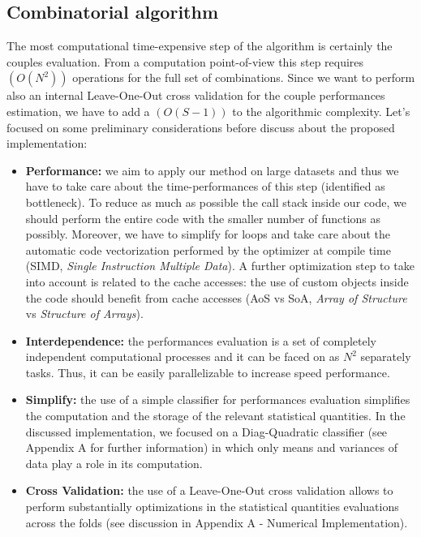 \documentclass{standalone}
\begin{document}
\subsection[Pairs evaluation]{Combinatorial algorithm}\label{implementation:couples}

The most computational time-expensive step of the algorithm is certainly the couples evaluation.
From a computation point-of-view this step requires $(O(N^2))$ operations for the full set of combinations.
Since we want to perform also an internal Leave-One-Out cross validation for the couple performances estimation, we have to add a $(O(S-1))$ to the algorithmic complexity.
Let's focused on some preliminary considerations before discuss about the proposed implementation:

\begin{itemize}

\item \textbf{Performance:} we aim to apply our method on large datasets and thus we have to take care about the time-performances of this step (identified as bottleneck).
To reduce as much as possible the call stack inside our code, we should perform the entire code with the smaller number of functions as possibly.
Moreover, we have to simplify \textsf{for} loops and take care about the automatic code vectorization performed by the optimizer at compile time (SIMD, \emph{Single Instruction Multiple Data}).
A further optimization step to take into account is related to the cache accesses: the use of custom objects inside the code should benefit from cache accesses (AoS vs SoA, \emph{Array of Structure} vs \emph{Structure of Arrays}).

\item \textbf{Interdependence:} the performances evaluation is a set of completely independent computational processes and it can be faced on as $N^2$ separately tasks.
Thus, it can be easily parallelizable to increase speed performance.

\item \textbf{Simplify:} the use of a simple classifier for performances evaluation simplifies the computation and the storage of the relevant statistical quantities.
In the discussed implementation, we focused on a Diag-Quadratic classifier (see Appendix A for further information) in which only means and variances of data play a role in its computation.

\item \textbf{Cross Validation:} the use of a Leave-One-Out cross validation allows to perform substantially optimizations in the statistical quantities evaluations across the folds (see discussion in Appendix A - Numerical Implementation).


\end{itemize}
\end{document}
